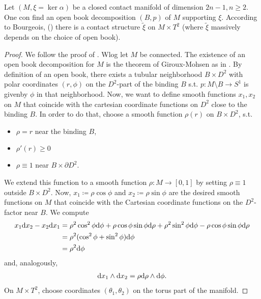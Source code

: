 \begin{theorem}\label{thm:bourgeois}
    Let $(M, \xi = \ker \alpha )$ be a closed contact manifold of dimension $2n - 1, n \geq 2$. One con find an open book decomposition $(B,p)$ of $M$ supporting $\xi$. According to Bourgeois, (\cite{Bourgeois02}) there is a contact structure $\tilde{\xi}$ on $M \times T^2$ (where $\tilde \xi$ massively depends on the choice of open book).
\end{theorem}
\begin{proof}
    We follow the proof of \cite[Thm 7.3.6]{Geiges08}.
    Wlog let $M$ be connected.
    The existence of an open book decomposition for $M$ is the theorem of Giroux-Mohsen as in \cite[Thm 7.3.5]{Geiges08}.
    By definition of an open book, there exists a tubular neighborhood $B \times D^2$ with polar coordinates $(r, \phi)$ on the $D^2$-part of the binding $B$ s.t. $p: M \setminus B \to S^1$ is givenby $\phi$ in that neighborhood.
    Now, we want to define smooth functions $x_1, x_2$ on $M$ that coincide with the cartesian coordinate functions on $D^2$ close to the binding $B$. In order to do that, choose a smooth function $\rho(r)$ on $B \times D^2$, s.t. 
    \begin{itemize}
        \item $\rho = r$ near the binding $B$,
        \item $\rho'(r) \geq 0$
        \item $\rho \equiv 1$ near $B \times \partial D^2$.
    \end{itemize}
    We extend this function to a smooth function $\rho: M \to [0,1]$
    by setting $\rho \equiv 1$ outside $B\times D^2$.
    Now, $x_1 \coloneqq \rho \cos \phi$ and $x_2 \coloneqq \rho \sin \phi$ are the desired smooth functions on $M$ that coincide with the Cartesian coordinate functions on the $D^2$-factor near $B$.
    We compute
    \begin{align*}
        x_1 \mathrm{d} x_2 - x_2 \mathrm{d} x_1 &= \rho^2 \cos^2 \phi \mathrm{d} \phi + \rho \cos \phi \sin \phi \mathrm{d} \rho + \rho^2 \sin^2 \phi \mathrm{d} \phi - \rho \cos \phi \sin \phi \mathrm{d} \rho\\
        &= \rho^2 (\cos^2 \phi + \sin^2 \phi) \mathrm{d} \phi\\
        &= \rho^2 \mathrm{d} \phi
    \end{align*}
    and, analogously,
    \begin{align*}
        \mathrm{d} x_1 \wedge \mathrm{d} x_2 = \rho \mathrm{d} \rho \wedge \mathrm{d} \phi.
    \end{align*}
    On $M\times T^2$, choose coordinates $(\theta_1, \theta_2)$ on the torus part of the manifold.

\end{proof}
